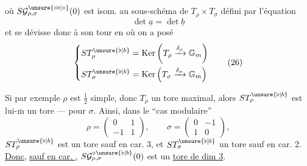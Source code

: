 
où $S\mathcal{G}_{\rho,\sigma}^{\unsure{\circ\flat|\circ}}(0)$ est isom. au sous-schéma de
$T_\rho\times T_\sigma$ défini par l'équation
\[
\det\underline{a}=\det\underline{b}
\tag{24}
\]
et se dévisse donc à son tour en
où on a posé
\[
\left\{
\begin{aligned}
ST_\rho^{\unsure{\flat|b}}&=\operatorname{Ker}\left(T_\rho\xrightarrow{\delta_\rho}\mathbb{G}_m\right)\\
ST_\sigma^{\unsure{\flat|b}}&=\operatorname{Ker}\left(T_\sigma\xrightarrow{\delta_\sigma}\mathbb{G}_m\right)
\end{aligned}
\right.
\tag{26}
\]

Si par exemple $\rho$  est $\frac12$ simple, donc $T_\rho$ un
tore maximal, alors $ST_\rho^{\unsure{\flat|b}}$ est lui-$\overline{\mathrm m}$ un tore  ---
 pour $\sigma$. Ainsi,  dans le ``cas modulaire''
\[
\rho=\begin{pmatrix}0&1\\-1&1\end{pmatrix},\qquad
\sigma=\begin{pmatrix}0&-1\\1&0\end{pmatrix},
\]
$ST_\rho^{\unsure{\flat|b}}$ est un
tore  sauf en car. 3, et $ST_\sigma^{\unsure{\flat|b}}$ un tore sauf en
car. 2. \uline{Donc}, \uline{sauf en car. }, $S\mathcal{G}_{\rho,\sigma}^{\circ\unsure{\flat|b}}(0)$ est un
\uline{tore de dim 3}.

